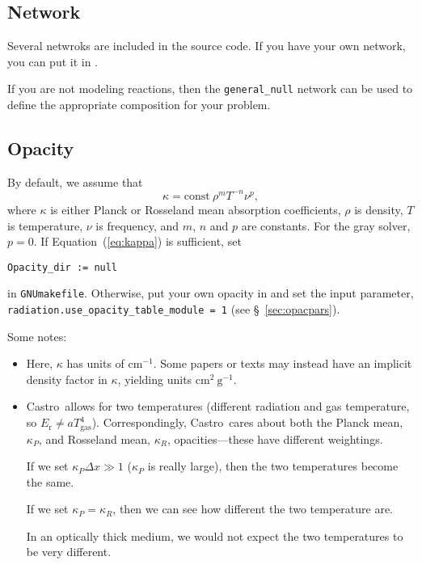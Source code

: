 \documentclass[11pt,letterpaper]{article}
\newcommand{\castro}{{\sf Castro}}
\begin{document}
  

\subsection{Network}

Several netwroks are included in the source code.  If you have your
own network, you can put it in
{\tt{}}.

If you are not modeling reactions, then the {\tt general\_null}
network can be used to define the appropriate composition for
your problem.

\subsection{Opacity}

By default, we assume that
\begin{equation}
  \kappa = \mathrm{const}\ \rho^{m} T^{-n} \nu^{p} , \label{eq:kappa}
\end{equation}
where $\kappa$ is either Planck or Rosseland mean absorption
coefficients, $\rho$ is density, $T$ is temperature, $\nu$ is
frequency, and $m$, $n$ and $p$ are constants.  For the gray solver,
$p = 0$.  If Equation~(\ref{eq:kappa}) is sufficient, set
\begin{verbatim}
Opacity_dir := null
\end{verbatim}
in {\tt GNUmakefile}.  Otherwise, put your own opacity in
{\tt{}} and set
the input parameter, {\tt radiation.use\_opacity\_table\_module = 1} (see
\S~\ref{sec:opacpars}).

Some notes:
\begin{itemize}
\item Here, $\kappa$ has units of $\mathrm{cm}^{-1}$.  Some papers or
  texts may instead have an implicit density factor in $\kappa$,
  yielding units $\mathrm{cm}^2~\mathrm{g}^{-1}$.

\item \castro\ allows for two temperatures (different radiation and gas
  temperature, so $E_\mathrm{r} \ne a T_\mathrm{gas}^4$).
  Correspondingly,  \castro\ cares about both the Planck mean,
  $\kappa_P$, and Rosseland mean, $\kappa_R$, opacities---these have
  different weightings.

  If we set $\kappa_P \Delta x \gg 1$ ($\kappa_P$ is really large),
  then the two temperatures become the same.

  If we set $\kappa_P = \kappa_R$, then we can see how different the
  two temperature are.

  In an optically thick medium, we would not expect the two temperatures
  to be very different.

\end{itemize}
\end{document}
